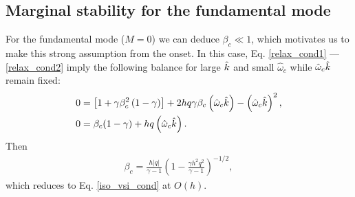 \subsection{Marginal stability for the fundamental
  mode}\label{bcrit_alt}
For the fundamental mode ($M=0$) we can deduce $\beta_c\ll 1$, which
motivates us to make this strong assumption from the onset. In this
case, Eq. \ref{relax_cond1} --- \ref{relax_cond2} 
imply the following balance for large $\hat{k}$ and small
$\hat{\omega}_c$ while $\hat{\omega}_c\hat{k}$ remain fixed:  
\begin{subequations}\begin{align}
    &0  = \left[1 + \gamma\beta_c^2\left(1-\gamma\right)\right] + 2h q
    \gamma \beta_c \left(\hat{\omega}_c\hat{k}\right) - \left(\hat{\omega}_c\hat{k}\right)^2,\\
    &0 =  \beta_c(1-\gamma) + hq \left(\hat{\omega}_c\hat{k}\right). 
  \end{align}\end{subequations}
Then
\begin{align}
  \beta_c = \frac{h|q|}{\gamma-1}\left(1 - \frac{\gamma h^2 
      q^2}{\gamma-1}\right)^{-1/2},
\end{align}
which reduces to Eq. \ref{iso_vsi_cond} at $O(h)$. 




